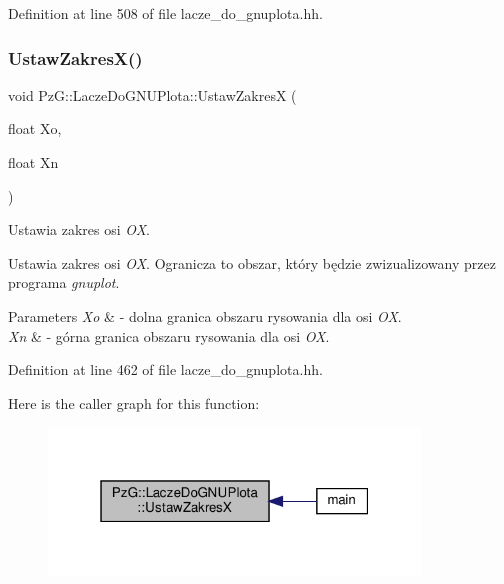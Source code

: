 Definition at line 508 of file lacze\+\_\+do\+\_\+gnuplota.\+hh.

\mbox{\label{class_pz_g_1_1_lacze_do_g_n_u_plota_a9c91987dfc869d6fcea96205c581daef}} 
\subsubsection{\texorpdfstring{Ustaw\+Zakres\+X()}{UstawZakresX()}}
{\footnotesize\ttfamily void Pz\+G\+::\+Lacze\+Do\+G\+N\+U\+Plota\+::\+Ustaw\+ZakresX (\begin{DoxyParamCaption}\item[{float}]{Xo,  }\item[{float}]{Xn }\end{DoxyParamCaption})\hspace{0.3cm}{\ttfamily [inline]}}



Ustawia zakres osi {\itshape OX}. 

Ustawia zakres osi {\itshape OX}. Ogranicza to obszar, który będzie zwizualizowany przez programa {\itshape gnuplot}. 
\begin{DoxyParams}{Parameters}
{\em Xo} & -\/ dolna granica obszaru rysowania dla osi {\itshape OX}. \\
\hline
{\em Xn} & -\/ górna granica obszaru rysowania dla osi {\itshape OX}. \\
\hline
\end{DoxyParams}


Definition at line 462 of file lacze\+\_\+do\+\_\+gnuplota.\+hh.

Here is the caller graph for this function\+:\nopagebreak
\begin{figure}[H]
\begin{center}
\leavevmode
\includegraphics[width=280pt]{class_pz_g_1_1_lacze_do_g_n_u_plota_a9c91987dfc869d6fcea96205c581daef_icgraph}
\end{center}
\end{figure}
\mbox{\label{class_pz_g_1_1_lacze_do_g_n_u_plota_a54c6e9cf9ab2eae479451fd953c2717c}} 

